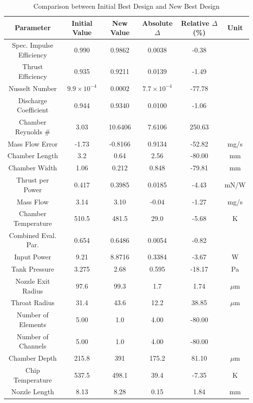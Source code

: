 \documentclass{homework}
\begin{document}
\begin{multicols}{2}
\begin{table}[t] %
\centering
\caption{Comparison between Initial Best Design and New Best Design}
\label{tab:deltas}
\begin{tabular}{|c|c|c|c|c|c|}
\hline
\textbf{Parameter} & \textbf{Initial Value} & \textbf{New Value} & \textbf{Absolute $\Delta$} & \textbf{Relative $\Delta$ (\%)} & \textbf{Unit} \\
\hline
Spec. Impulse Efficiency & 0.990 & 0.9862 & 0.0038 & -0.38 & \\
Thrust Efficiency & 0.935 & 0.9211 & 0.0139 & -1.49 & \\
Nusselt Number & $9.9 \times 10^{-4}$ & $0.0002$ & $7.7 \times 10^{-4}$ & -77.78 & \\
Discharge Coefficient & 0.944 & 0.9340 & 0.0100 & -1.06 & \\
Chamber Reynolds \# & 3.03 & 10.6406 & 7.6106 & 250.63 & \\
Mass Flow Error & -1.73 & -0.8166 & 0.9134 & -52.82 & mg/s \\
Chamber Length & 3.2 & 0.64 & 2.56 & -80.00 & mm \\
Chamber Width & 1.06 & 0.212 & 0.848 & -79.81 & mm \\
Thrust per Power & 0.417 & 0.3985 & 0.0185 & -4.43 & mN/W \\
Mass Flow & 3.14 & 3.10 & -0.04 & -1.27 & mg/s \\
Chamber Temperature & 510.5 & 481.5 & 29.0 & -5.68 & K \\
Combined Eval. Par. & 0.654 & 0.6486 & 0.0054 & -0.82 & \\
Input Power & 9.21 & 8.8716 & 0.3384 & -3.67 & W \\
Tank Pressure & 3.275 & 2.68 & 0.595 & -18.17 & Pa \\
Nozzle Exit Radius & 97.6 & 99.3 & 1.7 & 1.74 & $\mu$m \\
Throat Radius & 31.4 & 43.6 & 12.2 & 38.85 & $\mu$m \\
Number of Elements & 5.00 & 1.0 & 4.00 & -80.00 & \\
Number of Channels & 5.00 & 1.0 & 4.00 & -80.00 & \\
Chamber Depth & 215.8 & 391 & 175.2 & 81.10 & $\mu$m \\
Chip Temperature & 537.5 & 498.1 & 39.4 & -7.35 & K \\
Nozzle Length & 8.13 & 8.28 & 0.15 & 1.84 & mm \\
\hline
\end{tabular}
\end{table}


\end{multicols}
\end{document}
